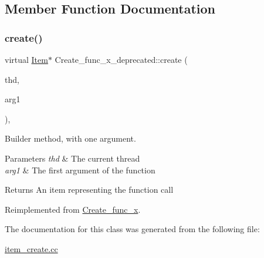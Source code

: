 \subsection{Member Function Documentation}
\mbox{\label{classCreate__func__x__deprecated_a462bc6798ecac85b5820b0d13b998507}} 
\subsubsection{\texorpdfstring{create()}{create()}}
{\footnotesize\ttfamily virtual \mbox{\hyperlink{classItem}{Item}}$\ast$ Create\+\_\+func\+\_\+x\+\_\+deprecated\+::create (\begin{DoxyParamCaption}\item[{T\+HD $\ast$}]{thd,  }\item[{\mbox{\hyperlink{classItem}{Item}} $\ast$}]{arg1 }\end{DoxyParamCaption})\hspace{0.3cm}{\ttfamily [inline]}, {\ttfamily [virtual]}}

Builder method, with one argument. 
\begin{DoxyParams}{Parameters}
{\em thd} & The current thread \\
\hline
{\em arg1} & The first argument of the function \\
\hline
\end{DoxyParams}
\begin{DoxyReturn}{Returns}
An item representing the function call 
\end{DoxyReturn}


Reimplemented from \mbox{\hyperlink{classCreate__func__x_a3e8336dedac36c41fd771cc35049ddbe}{Create\+\_\+func\+\_\+x}}.



The documentation for this class was generated from the following file\+:\begin{DoxyCompactItemize}
\item 
\mbox{\hyperlink{item__create_8cc}{item\+\_\+create.\+cc}}\end{DoxyCompactItemize}
